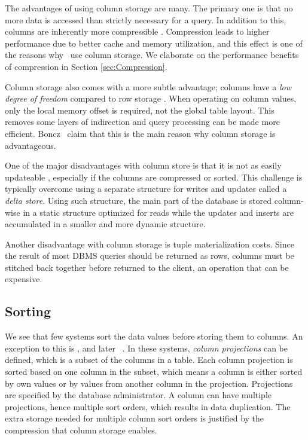 The advantages of using column storage are many. The primary one is that no more data is accessed than strictly necessary for a query. In addition to this, columns are inherently more compressible \cite{noauthor_undated-vq}. Compression leads to higher performance due to better cache and memory utilization, and this effect is one of the reasons why \mssql~use column storage. We elaborate on the performance benefits of compression in Section \ref{sec:Compression}.

Column storage also comes with a more subtle advantage; columns have a \textit{low degree of freedom} compared to row storage \cite{Boncz2005-wj}. When operating on column values, only the local memory offset is required, not the global table layout. This removes some layers of indirection and query processing can be made more efficient. Boncz \ea~claim that this is the main reason why column storage is advantageous.

One of the major disadvantages with column store is that it is not as easily updateable \cite{Bjorklund2011-wh}, especially if the columns are compressed or sorted. This challenge is typically overcome using a separate structure for writes and updates called a \textit{delta store}. Using such structure, the main part of the database is stored column-wise in a static structure optimized for reads while the updates and inserts are accumulated in a smaller and more dynamic structure.  

Another disadvantage with column storage is tuple materialization costs. Since the result of most DBMS queries should be returned as rows, columns must be stitched back together before returned to the client, an operation that can be expensive.

\subsection{Sorting}
\label{sub:Sorting}
We see that few systems sort the data values before storing them to columns. An exception to this is \cstore, and later \vertica~\cite{Lamb2012-kg, Stonebraker2005-qz}. In these systems, \textit{column projections} can be defined, which is a subset of the columns in a table. Each column projection is sorted based on one column in the subset, which means a column is either sorted by own values or by values from another column in the projection. Projections are specified by the database administrator. A column can have multiple projections, hence multiple sort orders, which results in data duplication. The extra storage needed for multiple column sort orders is justified by the compression that column storage enables.


